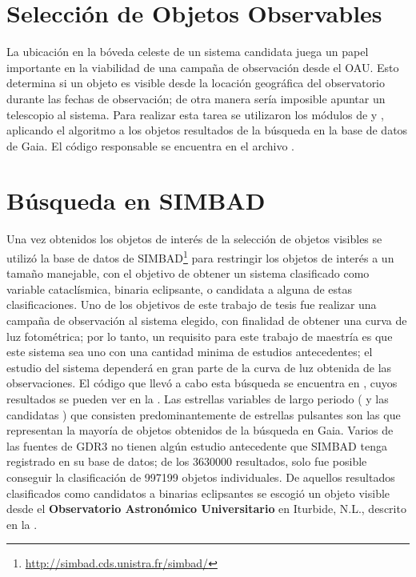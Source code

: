 \section{Selección de Objetos Observables}

La ubicación en la bóveda celeste de un sistema candidata juega un papel
importante en la viabilidad de una campaña de observación desde el OAU. Esto
determina si un objeto es visible desde la locación geográfica del observatorio
durante las fechas de observación; de otra manera sería imposible apuntar un
telescopio al sistema. Para realizar esta tarea se utilizaron los módulos de
  y  , aplicando
el algoritmo a los objetos resultados de la búsqueda en la base de datos de
Gaia. El código responsable se encuentra en el archivo
\href{https://github.com/KnightIV/UANL_MAPTA_Observaciones/blob/main/obsrv_plan/gaia/observable_targets.py}{}.

\section{Búsqueda en SIMBAD}

Una vez obtenidos los objetos de interés de la selección de objetos visibles se
utilizó la base de datos de
SIMBAD\footnote{\url{http://simbad.cds.unistra.fr/simbad/}}
 para restringir los objetos de interés a un
tamaño manejable, con el objetivo de obtener un sistema clasificado como
variable cataclísmica, binaria eclipsante, o candidata a alguna de estas
clasificaciones. Uno de los objetivos de este trabajo de tesis fue realizar una
campaña de observación al sistema elegido, con finalidad de obtener una curva de
luz fotométrica; por lo tanto, un requisito para este trabajo de maestría es que
este sistema sea uno con una cantidad minima de estudios antecedentes; el
estudio del sistema dependerá en gran parte de la curva de luz obtenida de las
observaciones. El código que llevó a cabo esta búsqueda se encuentra en
\href{https://github.com/KnightIV/UANL_MAPTA_Observaciones/blob/main/obsrv_plan/simbad/categorize_all_targets.ipynb}{},
cuyos resultados se pueden ver en la .
Las estrellas variables de largo periodo ( y las candidatas
) que consisten predominantemente de estrellas
pulsantes son las que representan la mayoría de objetos obtenidos de la búsqueda
en Gaia. Varios de las fuentes de GDR3 no tienen algún estudio antecedente que
SIMBAD tenga registrado en su base de datos; de los \num{3630000} resultados,
solo fue posible conseguir la clasificación de \num{997199} objetos
individuales. De aquellos resultados clasificados como candidatos a binarias
eclipsantes se escogió un objeto visible desde el \textbf{Observatorio
Astronómico Universitario} en Iturbide, N.L., descrito en la
.

